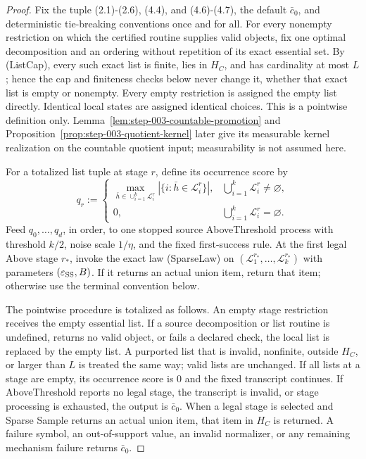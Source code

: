 \begin{proof}
Fix the tuple (2.1)-(2.6), (4.4), and (4.6)-(4.7), the default
\(\bar c_0\), and deterministic tie-breaking conventions once and for all.
For every nonempty restriction on which the certified routine supplies valid
objects, fix one optimal decomposition and an ordering without repetition of
its exact essential set. By (ListCap), every such exact list is finite, lies
in \(H_C\), and has cardinality at most \(L\); hence the cap and finiteness
checks below never change it, whether that exact list is empty or nonempty.
Every empty restriction is assigned the empty list directly. Identical local
states are assigned identical choices. This is a pointwise definition only.
Lemma~\ref{lem:step-003-countable-promotion} and
Proposition~\ref{prop:step-003-quotient-kernel} later give its measurable
kernel realization on the countable quotient input; measurability is not
assumed here.

For a totalized list tuple at stage \(r\), define its occurrence score by
\[
q_r:=
\begin{cases}
\displaystyle\max_{\bar h\in\cup_{i=1}^k\mathcal L_i^r}
|\{i:\bar h\in\mathcal L_i^r\}|,
&\bigcup_{i=1}^k\mathcal L_i^r\ne\varnothing,\\[4pt]
0,&\bigcup_{i=1}^k\mathcal L_i^r=\varnothing.
\end{cases}
\tag{5.1}
\]
Feed \(q_0,\ldots,q_d\), in order, to one stopped source
AboveThreshold process with threshold \(k/2\), noise scale \(1/\eta\), and
the fixed first-success rule. At the first legal Above stage \(r_*\), invoke
the exact law (SparseLaw) on
\((\mathcal L_1^{r_*},\ldots,\mathcal L_k^{r_*})\) with parameters
\((\varepsilon_{\rm SS},B)\). If it returns an actual union item, return
that item; otherwise use the terminal convention below.

The pointwise procedure is totalized as follows. An empty stage restriction
receives the empty essential list. If a source decomposition or list routine
is undefined, returns no valid object, or fails a declared check, the local
list is replaced by the empty list. A purported list that is invalid,
nonfinite, outside \(H_C\), or larger than \(L\) is treated the same way;
valid lists are unchanged. If all lists at a stage are empty, its occurrence
score is \(0\) and the fixed transcript continues. If AboveThreshold reports
no legal stage, the transcript is invalid, or stage processing is exhausted,
the output is \(\bar c_0\). When a legal stage is selected and Sparse Sample
returns an actual union item, that item in \(H_C\) is returned. A failure
symbol, an out-of-support value, an invalid normalizer, or any remaining
mechanism failure returns \(\bar c_0\).


\end{proof}
